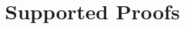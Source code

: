 \documentclass[11pt]{article}
\def\blue#1{\textcolor{blue}{#1}}
\newtheorem{lemma}{Lemma}
\begin{document}

\section{Supported Proofs}
\end{document}
